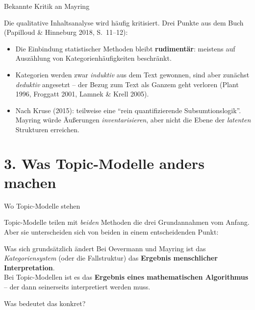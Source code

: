 \documentclass[aspectratio=169,11pt]{beamer}
\let\oldemph\emph
\renewcommand{\emph}[1]{{\color{solCyan}\oldemph{#1}}}
\let\oldtextbf\textbf
\renewcommand{\textbf}[1]{{\color{solBase3}\oldtextbf{#1}}}
\begin{document}
\begin{frame}{Bekannte Kritik an Mayring}

  Die qualitative Inhaltsanalyse wird häufig kritisiert.
  Drei Punkte aus dem Buch (Papilloud \& Hinneburg 2018, S.~11–12):

  \vfill
  \begin{itemize}
    \item Die Einbindung statistischer Methoden bleibt
          \textbf{rudimentär}: meistens auf Auszählung von
          Kategorienhäufigkeiten beschränkt.
    \vfill
    \item Kategorien werden zwar \emph{induktiv} aus dem Text gewonnen,
          sind aber zunächst \emph{deduktiv} angesetzt – der Bezug
          zum Text als Ganzem geht verloren (Plant 1996,
          Froggatt 2001, Lamnek \& Krell 2005).
    \vfill
    \item Nach Kruse (2015): teilweise eine \enquote{rein quantifizierende
          Subsumtionslogik}. Mayring würde Äußerungen
          \emph{inventarisieren}, aber nicht die Ebene der
          \emph{latenten} Strukturen erreichen.
  \end{itemize}

\end{frame}

\section{3. Was Topic-Modelle anders machen}

\begin{frame}{Wo Topic-Modelle stehen}

  Topic-Modelle teilen mit \emph{beiden} Methoden die drei
  Grundannahmen vom Anfang. Aber sie unterscheiden sich von
  beiden in einem entscheidenden Punkt:

  \vfill
  \begin{block}{Was sich grundsätzlich ändert}
    Bei Oevermann und Mayring ist das \emph{Kategoriensystem}
    (oder die Fallstruktur) das \textbf{Ergebnis menschlicher
    Interpretation}.
    \\[4pt]
    Bei Topic-Modellen ist es das \textbf{Ergebnis eines mathematischen
    Algorithmus} – der dann seinerseits interpretiert werden muss.
  \end{block}

  \vfill
  Was bedeutet das konkret?

\end{frame}
\end{document}
